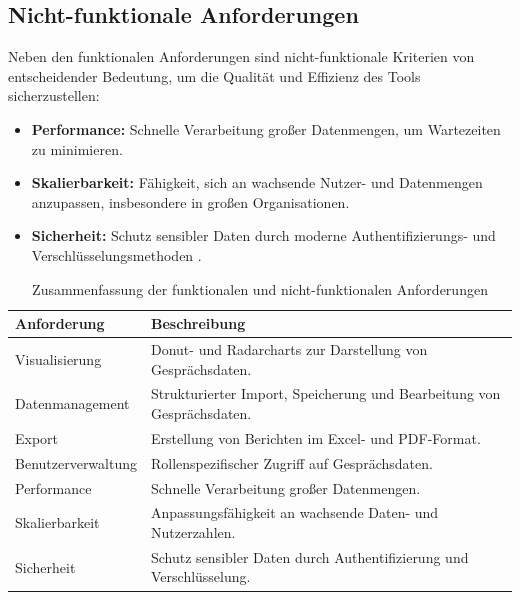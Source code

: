 \subsection{Nicht-funktionale Anforderungen}
Neben den funktionalen Anforderungen sind nicht-funktionale Kriterien von entscheidender Bedeutung, um die Qualität und Effizienz des Tools sicherzustellen:
\begin{itemize}
    \item \textbf{Performance:} Schnelle Verarbeitung großer Datenmengen, um Wartezeiten zu minimieren.
    \item \textbf{Skalierbarkeit:} Fähigkeit, sich an wachsende Nutzer- und Datenmengen anzupassen, insbesondere in großen Organisationen.
    \item \textbf{Sicherheit:} Schutz sensibler Daten durch moderne Authentifizierungs- und Verschlüsselungsmethoden \cite{schober2008}.
\end{itemize}

\begin{table}[h!]
\centering
\caption{Zusammenfassung der funktionalen und nicht-funktionalen Anforderungen}
\label{tab:anforderungen_uebersicht}
\begin{tabularx}{\textwidth}{|X|X|}
\hline
\textbf{Anforderung}              & \textbf{Beschreibung}                                                                                                   \\\hline
Visualisierung                   & Donut- und Radarcharts zur Darstellung von Gesprächsdaten. \\\hline
Datenmanagement                  & Strukturierter Import, Speicherung und Bearbeitung von Gesprächsdaten. \\\hline
Export                           & Erstellung von Berichten im Excel- und PDF-Format. \\\hline
Benutzerverwaltung               & Rollenspezifischer Zugriff auf Gesprächsdaten. \\\hline
Performance                      & Schnelle Verarbeitung großer Datenmengen. \\\hline
Skalierbarkeit                   & Anpassungsfähigkeit an wachsende Daten- und Nutzerzahlen. \\\hline
Sicherheit                       & Schutz sensibler Daten durch Authentifizierung und Verschlüsselung. \\\hline
\end{tabularx}
\end{table}

